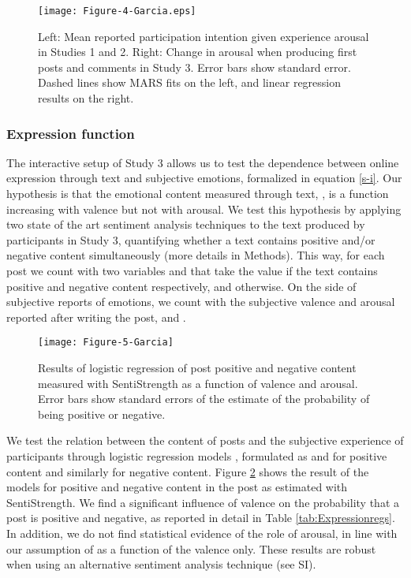 \documentclass[nologo,url,11pt,a4paper]{ETHpaper}
\begin{document}
\begin{figure}[h]
\centering
\texttt{[image: Figure-4-Garcia.eps]}
\caption{Left: Mean reported
  participation intention given experience arousal in Studies 1 and 2. Right:
  Change in arousal when producing first posts and comments in Study 3. Error bars show standard
  error. Dashed lines show MARS fits on the left, and linear regression results on the right.
  \label{fig:Participate} }
\end{figure}


\subsubsection{Expression function} 

The interactive setup of Study 3 allows us to test the dependence between
online expression through text and subjective emotions, formalized in equation
\ref{s-i}. Our hypothesis is that the emotional content measured through
text, , is a function  increasing with valence but not with
arousal. We test this hypothesis by applying two state of the art sentiment
analysis techniques to the text produced by participants in Study 3,
quantifying whether a text contains positive and/or negative content
simultaneously (more details in Methods). This way, for each post  we count
with two variables  and  that take the value  if the text
contains positive and negative content respectively, and  otherwise. On the
side of subjective reports of emotions, we count with the subjective valence
and arousal reported after writing the post,  and .

\begin{figure}[ht]
\centering
\texttt{[image: Figure-5-Garcia]}
\caption{Results of logistic regression of post positive and negative content measured with
SentiStrength as a function of valence and arousal. Error bars show standard errors of the estimate of
the probability of being positive or negative.\label{fig:Expression} } \end{figure}


We test the relation between the content of posts and the subjective
experience of participants through logistic regression models
\cite{Crawley2014}, formulated as  and
 for positive content and similarly for negative
content. Figure \ref{fig:Expression} shows the result of the models for
positive and negative content in the post as estimated with SentiStrength. We
find a significant influence of valence on the probability that a post is
positive and negative, as reported in detail in Table
\ref{tab:Expressionregs}. In addition, we do not find statistical evidence of
the role of arousal, in line with our assumption of  as a function of the
valence only. These results are robust when using an alternative sentiment
analysis technique (see SI).
\end{document}
